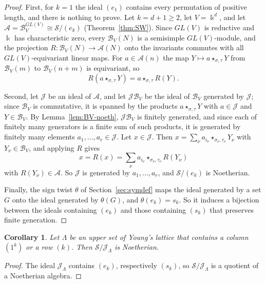 \documentclass[11pt]{amsart}
\newtheorem{corollary}[theorem]{Corollary}
\theoremstyle{definition}
\theoremstyle{remark}
\newcommand{\kk}{\Bbbk}
\newcommand{\cA}{\mathscr{A}}
\newcommand{\cB}{\mathcal{B}}
\newcommand{\cJ}{\mathscr{J}}
\newcommand{\cS}{\mathscr{S}}
\begin{document}
\begin{proof}
First, for $k=1$ the ideal $(e_1)$ contains every permutation of positive length, and there is nothing to prove. Let $k=d+1\ge2$, let $V=\kk^d$, and let $\cA=\cB_V^{GL(V)}\cong\cS/(e_k)$ (Theorem~\ref{thm:SW}). Since $GL(V)$ is reductive and $\kk$ has characteristic zero, every $\cB_V(N)$ is a semisimple $GL(V)$-module, and the projection $R\colon \cB_V(N)\to\cA(N)$ onto the invariants commutes with all $GL(V)$-equivariant linear maps. For $a\in\cA(n)$ the map $Y\mapsto a\star_{\sigma,\tau}Y$ from $\cB_V(m)$ to $\cB_V(n+m)$ is equivariant, so
\[
R(a\star_{\sigma,\tau}Y)=a\star_{\sigma,\tau}R(Y).
\]

Second, let $\cJ$ be an ideal of $\cA$, and let $\cJ\cB_V$ be the ideal of $\cB_V$ generated by $\cJ$; since $\cB_V$ is commutative, it is spanned by the products $a\star_{\sigma,\tau}Y$ with $a\in\cJ$ and $Y\in \cB_V$. By Lemma~\ref{lem:BV-noeth}, $\cJ\cB_V$ is finitely generated, and since each of finitely many generators is a finite sum of such products, it is generated by finitely many elements $a_1,\dots,a_r\in\cJ$. Let $x\in\cJ$. Then $x=\sum_\nu a_{i_\nu}\star_{\sigma_\nu,\tau_\nu}Y_\nu$ with $Y_\nu\in \cB_V$, and applying $R$ gives
\[
x=R(x)=\sum_\nu a_{i_\nu}\star_{\sigma_\nu,\tau_\nu}R(Y_\nu)
\]
with $R(Y_\nu)\in\cA$. So $\cJ$ is generated by $a_1,\dots,a_r$, and $\cS/(e_k)$ is Noetherian.

Finally, the sign twist $\theta$ of Section~\ref{sec:symdef} maps the ideal generated by a set $G$ onto the ideal generated by $\theta(G)$, and $\theta(e_k)=s_k$. So it induces a bijection between the ideals containing $(e_k)$ and those containing $(s_k)$ that preserves finite generation.
\end{proof}

\begin{corollary}\label{cor:noeth-strip}
Let $\Lambda$ be an upper set of Young's lattice that contains a column $(1^k)$ or a row $(k)$. Then $\cS/\cJ_\Lambda$ is Noetherian.
\end{corollary}

\begin{proof}
The ideal $\cJ_\Lambda$ contains $(e_k)$, respectively $(s_k)$, so $\cS/\cJ_\Lambda$ is a quotient of a Noetherian algebra.
\end{proof}
\end{document}
